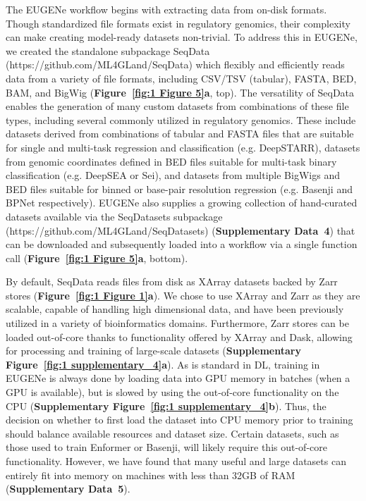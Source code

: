 The EUGENe workflow begins with extracting data from on-disk formats. Though standardized file formats exist in regulatory genomics, their complexity can make creating model-ready datasets non-trivial. To address this in EUGENe, we created the standalone subpackage SeqData (https://github.com/ML4GLand/SeqData) which flexibly and efficiently reads data from a variety of file formats, including CSV/TSV (tabular), FASTA, BED, BAM, and BigWig (\textbf{Figure~\ref{fig:1 Figure 5}\textbf{a}}, top). The versatility of SeqData enables the generation of many custom datasets from combinations of these file types, including several commonly utilized in regulatory genomics. These include datasets derived from combinations of tabular and FASTA files that are suitable for single and multi-task regression and classification (e.g. DeepSTARR\cite{De_Almeida2022-aa}), datasets from genomic coordinates defined in BED files suitable for multi-task binary classification (e.g. DeepSEA\cite{Zhou2015-rk} or Sei\cite{Chen2022-bn}), and datasets from multiple BigWigs and BED files suitable for binned or base-pair resolution regression (e.g. Basenji\cite{Kelley2018-if} and BPNet\cite{Avsec2021-sw} respectively). EUGENe also supplies a growing collection of hand-curated datasets available via the SeqDatasets subpackage (https://github.com/ML4GLand/SeqDatasets) (\textbf{\textbf{Supplementary Data~4}}) that can be downloaded and subsequently loaded into a workflow via a single function call (\textbf{Figure~\ref{fig:1 Figure 5}\textbf{a}}, bottom).

By default, SeqData reads files from disk as XArray datasets\cite{Hoyer2017-jv} backed by Zarr stores\cite{Miles2023-zk} (\textbf{Figure~\ref{fig:1 Figure 1}\textbf{a}}). We chose to use XArray and Zarr as they are scalable, capable of handling high dimensional data, and have been previously utilized in a variety of bioinformatics domains\cite{Baker2023-sp,Marconato2023-kz,Liu2021-km}. Furthermore, Zarr stores can be loaded out-of-core thanks to functionality offered by XArray and Dask\cite{Team2016-qa}, allowing for processing and training of large-scale datasets (\textbf{Supplementary Figure~\ref{fig:1 supplementary_4}\textbf{a}}). As is standard in DL, training in EUGENe is always done by loading data into GPU memory in batches (when a GPU is available), but is slowed by using the out-of-core functionality on the CPU (\textbf{Supplementary Figure~\ref{fig:1 supplementary_4}\textbf{b}}). Thus, the decision on whether to first load the dataset into CPU memory prior to training should balance available resources and dataset size. Certain datasets, such as those used to train Enformer\cite{Avsec2021-hh} or Basenji\cite{Kelley2018-if}, will likely require this out-of-core functionality. However, we have found that many useful and large datasets can entirely fit into memory on machines with less than 32GB of RAM (\textbf{\textbf{Supplementary Data~5}}).

